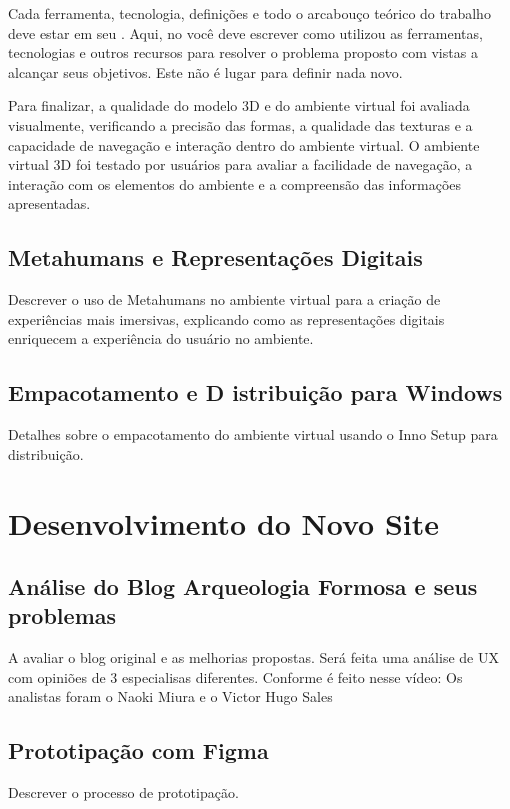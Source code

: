    Cada ferramenta, tecnologia, definições e todo o arcabouço teórico do trabalho deve estar em seu .
    Aqui, no  você deve escrever como utilizou as ferramentas, tecnologias e outros recursos para resolver o problema proposto com vistas a alcançar seus objetivos.
    Este não é lugar para definir nada novo.
    
    
    Para finalizar, a qualidade do modelo 3D e do ambiente virtual foi avaliada visualmente, verificando a precisão das formas, a qualidade das texturas e a capacidade de navegação e interação dentro do ambiente virtual. O ambiente virtual 3D foi testado por usuários para avaliar a facilidade de navegação, a interação com os elementos do ambiente e a compreensão das informações apresentadas.
    
    \subsection{Metahumans e Representações Digitais}
    Descrever o uso de Metahumans no ambiente virtual para a criação de experiências mais imersivas, explicando como as representações digitais enriquecem a experiência do usuário no ambiente.

    \subsection{Empacotamento e D
    istribuição para Windows}
    \label{sec:empacotamento}
    Detalhes sobre o empacotamento do ambiente virtual usando o Inno Setup para distribuição.

\section{Desenvolvimento do Novo Site}
\subsection{Análise do Blog Arqueologia Formosa e seus problemas}
A avaliar o blog original e as melhorias propostas.
Será feita uma análise de UX com opiniões de 3 especialisas diferentes.
Conforme é feito nesse vídeo: 
Os analistas foram o Naoki Miura e o Victor Hugo Sales


\subsection{Prototipação com Figma}
Descrever o processo de prototipação.


